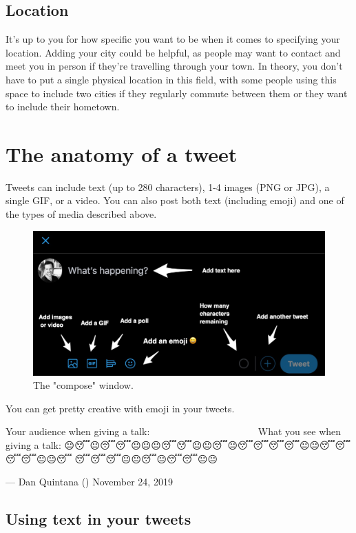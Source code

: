 \documentclass[]{book}
\begin{document}
\hypertarget{location}{%
\subsection{Location}\label{location}}

It's up to you for how specific you want to be when it comes to specifying your location. Adding your city could be helpful, as people may want to contact and meet you in person if they're travelling through your town. In theory, you don't have to put a single physical location in this field, with some people using this space to include two cities if they regularly commute between them or they want to include their hometown.

\hypertarget{the-anatomy-of-a-tweet}{%
\section{The anatomy of a tweet}\label{the-anatomy-of-a-tweet}}

Tweets can include text (up to 280 characters), 1-4 images (PNG or JPG), a single GIF, or a video. You can also post both text (including emoji) and one of the types of media described above.

\begin{figure}

\includegraphics[width=0.8\linewidth]{images/compose} \hfill{}

\caption{The "compose" window.}\label{fig:unnamed-chunk-2}
\end{figure}

You can get pretty creative with emoji in your tweets.

Your audience when giving a talk: 🙂🙂🙂😀🧐😀😀😏😀🤓😃😀😀😊😀😊🙂🙂😀🙂😀😴🙂😀🙂😀🙂😐🙂🙂😀🙂🙂🙂😀🙂😀🙂😀What you see when giving a talk: 😐😴😐😴😴😐😐😐😴😴😐😐😴😐😴😴😴😴😐😐😴😴😴😴😐😐😴🤔😴😴😴😐😐😴😐😴😴😐😐

--- Dan Quintana (\citet{dsquintana}) November 24, 2019

\hypertarget{using-text-in-your-tweets}{%
\subsection{Using text in your tweets}\label{using-text-in-your-tweets}}
\end{document}
